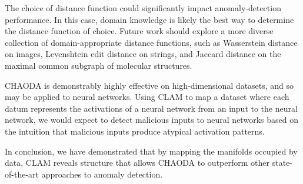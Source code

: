 The choice of distance function could significantly impact anomaly-detection performance.
In this case, domain knowledge is likely the best way to determine the distance function of choice.
Future work should explore a more diverse collection of domain-appropriate distance functions, such as Wasserstein distance on images, Levenshtein edit distance on strings, and Jaccard distance on the maximal common subgraph of molecular structures.

CHAODA is demonstrably highly effective on high-dimensional datasets, and so may be applied to neural networks.
Using CLAM to map a dataset where each datum represents the activations of a neural network from an input to the neural network, we would expect to detect malicious inputs to neural networks based on the intuition that malicious inputs produce atypical activation patterns.

In conclusion, we have demonstrated that by mapping the manifolds occupied by data, CLAM reveals structure that allows CHAODA to outperform other state-of-the-art approaches to anomaly detection.
